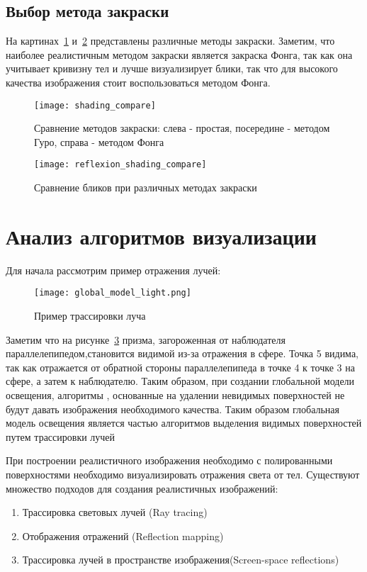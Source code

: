 \subsection{Выбор метода закраски}
На картинах~\ref{fig:shading_compare} и~\ref{fig:reflexion_shading_compare} представлены различные методы закраски. Заметим, что наиболее реалистичным методом закраски является
закраска Фонга, так как она учитывает кривизну тел и лучше визуализирует блики, так что для высокого качества изображения стоит воспользоваться методом Фонга.

\begin{figure}[H]
	\centering
	\texttt{[image: shading\_compare]}
	\caption{Сравнение методов закраски: слева - простая, посередине - методом Гуро, справа - методом Фонга}
	\label{fig:shading_compare}
\end{figure}

\begin{figure}[H]
	\centering
	\texttt{[image: reflexion\_shading\_compare]}
	\caption{Сравнение бликов при различных методах закраски}
	\label{fig:reflexion_shading_compare}
\end{figure}






\section[Анализ алгоритмов создания отражений]{Анализ алгоритмов визуализации}

Для начала рассмотрим пример отражения лучей:

\begin{figure}[H]
	\centering
	\texttt{[image: global\_model\_light.png]}
	\caption{Пример трассировки луча}
	\label{fig:global_model_light}
\end{figure} 

Заметим что на рисунке~\ref{fig:global_model_light}  призма, загороженная от наблюдателя параллелепипедом,становится видимой из-за отражения в сфере.
Точка 5 видима, так как отражается от обратной стороны параллелепипеда в точке 4 к точке 3 на сфере, а затем к наблюдателю.
Таким образом, при создании глобальной модели освещения, алгоритмы , основанные на удалении невидимых поверхностей не будут давать изображения необходимого качества.
Таким образом глобальная модель освещения является частью алгоритмов выделения видимых поверхностей путем трассировки лучей\cite{Rodgers}


При построении реалистичного изображения необходимо с полированными поверхностями необходимо визуализировать отражения света от тел.
Существуют множество подходов для создания реалистичных изображений:
\begin{enumerate}
	\item Трассировка световых лучей (Ray tracing)
	\item Отображения отражений (Reflection mapping)
	\item Трассировка лучей в пространстве изображения(Screen-space reflections)
\end{enumerate}





